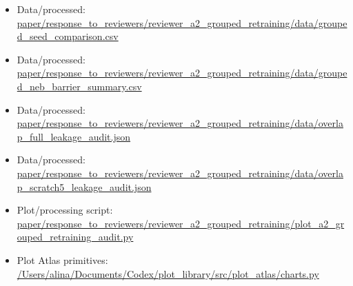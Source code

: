 \begin{itemize}[leftmargin=1.4em,noitemsep]
\item Data/processed: \begingroup\scriptsize\url{paper/response_to_reviewers/reviewer_a2_grouped_retraining/data/grouped_seed_comparison.csv}\endgroup
\item Data/processed: \begingroup\scriptsize\url{paper/response_to_reviewers/reviewer_a2_grouped_retraining/data/grouped_neb_barrier_summary.csv}\endgroup
\item Data/processed: \begingroup\scriptsize\url{paper/response_to_reviewers/reviewer_a2_grouped_retraining/data/overlap_full_leakage_audit.json}\endgroup
\item Data/processed: \begingroup\scriptsize\url{paper/response_to_reviewers/reviewer_a2_grouped_retraining/data/overlap_scratch5_leakage_audit.json}\endgroup
\item Plot/processing script: \begingroup\scriptsize\url{paper/response_to_reviewers/reviewer_a2_grouped_retraining/plot_a2_grouped_retraining_audit.py}\endgroup
\item Plot Atlas primitives: \begingroup\scriptsize\url{/Users/alina/Documents/Codex/plot_library/src/plot_atlas/charts.py}\endgroup
\end{itemize}
